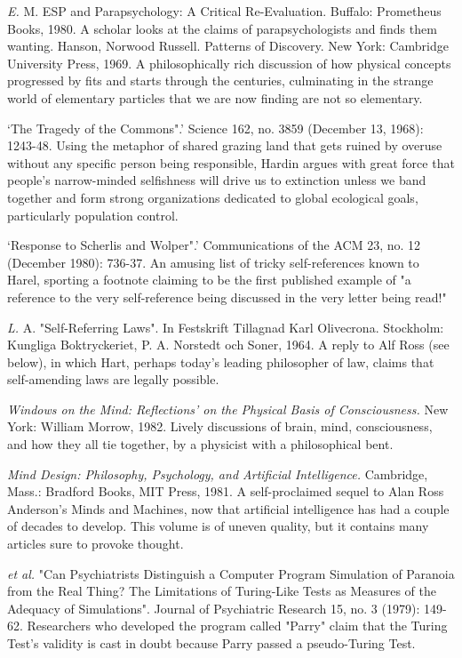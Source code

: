  {\sl E.} M. ESP and Parapsychology: A Critical Re-Evaluation. Buffalo: Prometheus Books, 1980. A scholar looks at the claims of parapsychologists and finds them wanting. Hanson, Norwood Russell. Patterns of Discovery. New York: Cambridge University Press, 1969. A philosophically rich discussion of how physical concepts progressed by fits and starts through the centuries, culminating in the strange world of elementary particles that we are now finding are not so elementary.

 `The Tragedy of the Commons".' Science 162, no. 3859 (December 13, 1968): 1243-48. Using the metaphor of shared grazing land that gets ruined by overuse without any specific person being responsible, Hardin argues with great force that people's narrow-minded selfishness will drive us to extinction unless we band together and form strong organizations dedicated to global ecological goals, particularly population control.

 `Response to Scherlis and Wolper".' Communications of the ACM 23, no. 12 (December 1980): 736-37. An amusing list of tricky self-references known to Harel, sporting a footnote claiming to be the first published example of "a reference to the very self-reference being discussed in the very letter being read!"

 {\sl L.} A. "Self-Referring Laws". In Festskrift Tillagnad Karl Olivecrona. Stockholm: Kungliga Boktryckeriet, P. A. Norstedt och Soner, 1964. A reply to Alf Ross (see below), in which Hart, perhaps today's leading philosopher of law, claims that self-amending laws are legally possible.

 {\sl Windows on the Mind: Reflections' on the Physical Basis of Consciousness.} New York: William Morrow, 1982. Lively discussions of brain, mind, consciousness, and how they all tie together, by a physicist with a philosophical bent.

 {\sl Mind Design: Philosophy, Psychology, and Artificial Intelligence.} Cambridge, Mass.: Bradford Books, MIT Press, 1981. A self-proclaimed sequel to Alan Ross Anderson's Minds and Machines, now that artificial intelligence has had a couple of decades to develop. This volume is of uneven quality, but it contains many articles sure to provoke thought.

 {\sl et al.} "Can Psychiatrists Distinguish a Computer Program Simulation of Paranoia from the Real Thing? The Limitations of Turing-Like Tests as Measures of the Adequacy of Simulations". Journal of Psychiatric Research 15, no. 3 (1979): 149-62. Researchers who developed the program called "Parry" claim that the Turing Test's validity is cast in doubt because Parry passed a pseudo-Turing Test.

